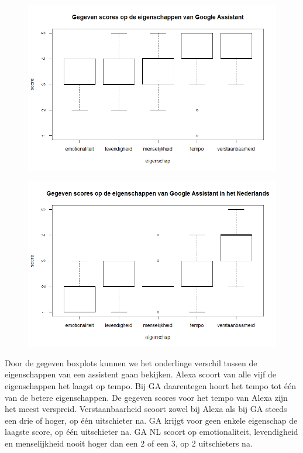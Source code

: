 \begin{figure}[h]
    \includegraphics[width=0.9\linewidth]{../onderzoek/onderzoeksresultaten/vergelijking_eigenschappen_per_assistent/boxplot_score_eigenschappen_GA}
    \caption{}
    \label{fig:boxplot-ga}
\end{figure}

\begin{figure}[h]
    \includegraphics[width=0.9\linewidth]{../onderzoek/onderzoeksresultaten/vergelijking_eigenschappen_per_assistent/boxplot_score_eigenschappen_GA_NL}
    \caption{}
    \label{fig:boxplot-ganl}
\end{figure}

Door de gegeven boxplots kunnen we het onderlinge verschil tussen de eigenschappen van een assistent gaan bekijken. Alexa scoort van alle vijf de eigenschappen het laagst op tempo. Bij \gls{GA} daarentegen hoort het tempo tot één van de betere eigenschappen. De gegeven scores voor het tempo van Alexa zijn het meest verspreid. 
Verstaanbaarheid scoort zowel bij Alexa als bij \gls{GA} steeds een drie of hoger, op één uitschieter na.
\gls{GA} krijgt voor geen enkele eigenschap de laagste score, op één uitschieter na.
\gls{GA NL} scoort op emotionaliteit, levendigheid en menselijkheid nooit hoger dan een 2 of een 3, op 2 uitschieters na.

